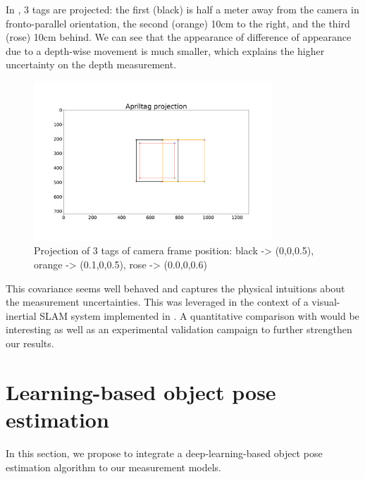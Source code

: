 In , 3 tags are projected: the first (black) is half a meter away from the camera in fronto-parallel orientation, the second (orange)
10cm to the right, and the third (rose) 10cm behind. We can see that the appearance of difference of appearance due to a depth-wise movement is much smaller, which 
explains the higher uncertainty on the depth measurement.

\begin{figure}[h]
    \centering
    \includegraphics[width=0.8\textwidth]{figures/apriltag_proj.pdf}
    \caption{Projection of 3 tags of camera frame position: black -> (0,0,0.5), orange -> (0.1,0,0.5), rose -> (0.0,0,0.6)}
    \label{fig:apriltag_proj}
\end{figure}

This covariance seems well behaved and captures the physical intuitions about the measurement uncertainties. 
This was leveraged in the context of a visual-inertial SLAM system implemented in . 
A quantitative comparison with \cite{urban2016mlpnp} would be interesting as well as an experimental validation campaign to further strengthen our results.


%
%
%
%
\section{Learning-based object pose estimation}
\label{sec:learning_based_object_pose_est}
In this section, we propose to integrate a deep-learning-based object pose estimation algorithm \cite{labbe2020cosypose} to our measurement models. 


